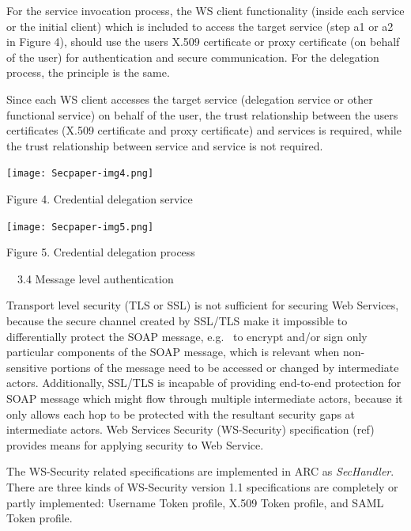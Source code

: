 \documentclass{article}
\begin{document}
For the service invocation process, the WS client functionality (inside
each service or the initial client) which is included to access the
target service (step a1 or a2 in Figure 4), should use the
user{\textquotesingle}s X.509 certificate or proxy certificate (on
behalf of the user) for authentication and secure communication. For
the delegation process, the principle is the same.

Since each WS client accesses the target service (delegation service or
other functional service) on behalf of the user, the trust relationship
between the user{\textquotesingle}s certificates (X.509 certificate and
proxy certificate) and services is required, while the trust
relationship between service and service is not required.

 

\begin{center}
\texttt{[image: Secpaper-img4.png]}
\end{center}

\bigskip


\bigskip

{\centering
Figure 4. Credential delegation service
\par}


\bigskip



\begin{center}
\texttt{[image: Secpaper-img5.png]}
\end{center}
{\centering
Figure 5. Credential delegation process
\par}


\bigskip

\ \ 3.4 Message level authentication

Transport level security (TLS or SSL) is not sufficient for securing Web
Services, because the secure channel created by SSL/TLS make it
impossible to differentially protect the SOAP message, e.g. \ to
encrypt and/or sign only particular components of the SOAP message,
which is relevant when non-sensitive portions of the message need to be
accessed or changed by intermediate actors. Additionally, SSL/TLS is
incapable of providing end-to-end protection for SOAP message which
might flow through multiple intermediate actors, because it only allows
each hop to be protected with the resultant security gaps at
intermediate actors. Web Services Security (WS-Security) specification
(ref) provides means for applying security to Web Service.

The WS-Security related specifications are implemented in ARC as
\textit{SecHandler}. There are three kinds of WS-Security version 1.1
specifications are completely or partly implemented: Username Token
profile, X.509 Token profile, and SAML Token profile.
\end{document}
